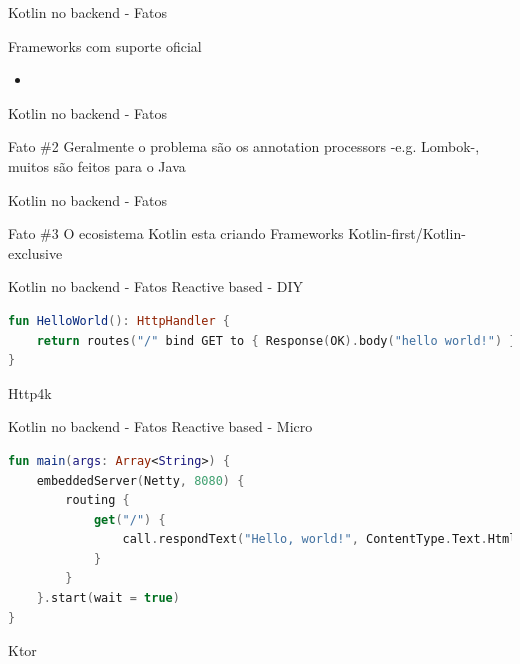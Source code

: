 \documentclass[aspectratio=169]{beamer}
\begin{document}
\begin{frame}{Kotlin no backend - Fatos}

Frameworks com suporte oficial

\begin{itemize}
\item
\end{itemize}

\end{frame}

\begin{frame}{Kotlin no backend - Fatos}

\begin{exampleblock}{Fato \#2}
Geralmente o problema são os annotation processors -e.g. Lombok-, muitos são feitos para o Java
\end{exampleblock}
\end{frame}

\begin{frame}{Kotlin no backend - Fatos}

\begin{exampleblock}{Fato \#3}
O ecosistema Kotlin esta criando Frameworks Kotlin-first/Kotlin-exclusive
\end{exampleblock}
\end{frame}

\begin{frame}[fragile]{Kotlin no backend - Fatos}
Reactive based - DIY
\begin{lstlisting}[language=Kotlin]
fun HelloWorld(): HttpHandler {
    return routes("/" bind GET to { Response(OK).body("hello world!") })
}
\end{lstlisting}
Http4k
\end{frame}

\begin{frame}[fragile]{Kotlin no backend - Fatos}
Reactive based - Micro
\begin{lstlisting}[language=Kotlin]
fun main(args: Array<String>) {
    embeddedServer(Netty, 8080) {
        routing {
            get("/") {
                call.respondText("Hello, world!", ContentType.Text.Html)
            }
        }
    }.start(wait = true)
}
\end{lstlisting}
Ktor
\end{frame}
\end{document}
